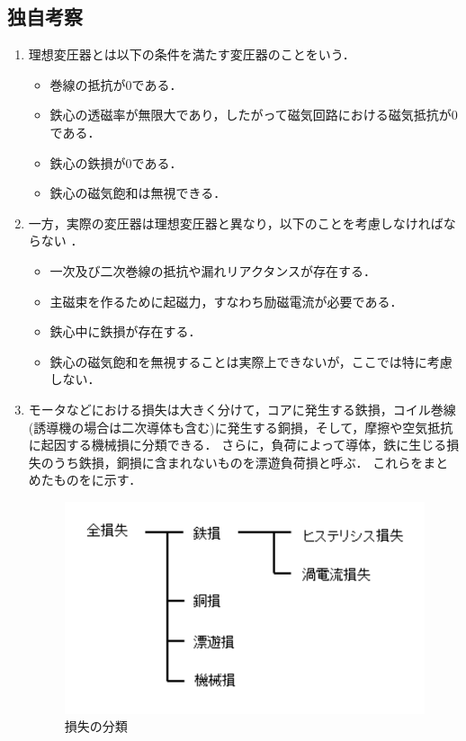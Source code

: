 \clearpage
\subsection{独自考察}
\begin{enumerate}[1.]
	\item 理想変圧器とは以下の条件を満たす変圧器のことをいう\cite{1130000795154912128}．
\begin{itemize}
	\item 巻線の抵抗が0である．
	\item 鉄心の透磁率が無限大であり，したがって磁気回路における磁気抵抗が0である．
	\item 鉄心の鉄損が0である．
	\item 鉄心の磁気飽和は無視できる．
\end{itemize}
\item 一方，実際の変圧器は理想変圧器と異なり，以下のことを考慮しなければならない
\label{real}
\cite{1130154912128}．
\begin{itemize}
	\item 一次及び二次巻線の抵抗や漏れリアクタンスが存在する．
	\item 主磁束を作るために起磁力，すなわち励磁電流が必要である．
	\item 鉄心中に鉄損が存在する．
	\item 鉄心の磁気飽和を無視することは実際上できないが，ここでは特に考慮しない．
\end{itemize}
\item モータなどにおける損失は大きく分けて，コアに発生する鉄損，コイル巻線(誘導機の場合は二次導体も含む)に発生する銅損，そして，摩擦や空気抵抗に起因する機械損に分類できる．
さらに，負荷によって導体，鉄に生じる損失のうち鉄損，銅損に含まれないものを漂遊負荷損と呼ぶ．
これらをまとめたものをに示す．
\begin{figure}[h]
	\centering
	\includegraphics[scale=0.8]{./fig/loss_analysis.pdf}
	\caption{損失の分類\cite{fdls}}
	\label{fig:loss_analysis}
\end{figure}
\end{enumerate}